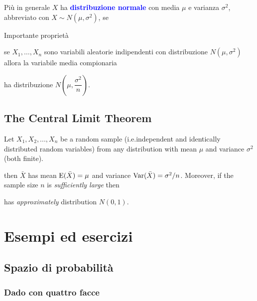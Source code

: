 \documentclass[12pt,openany]{book}
\def\E{{\rm E}}
\def\Var{{\rm Var}}
\def\emph#1{\textcolor{blue}{\textbf{\boldmath #1}}}
\theoremstyle{mio}
\theoremstyle{liscio}
\begin{document}
Più in generale $X$ ha \emph{distribuzione normale\/} con media $\mu$ e varianza $\sigma^2$, abbreviato con $X\sim N(\mu,\sigma^2)$, se

\medskip


\medskip

Importante proprietà




se $X_1,\dots,X_n$ sono variabili aleatorie indipendenti con distribuzione $N(\mu,\sigma^2)$ allora la variabile media compionaria

\ceq{\hfill \emph{$\bar X$}}{=}{\frac1n\sum_{i=1}^n X_i}

ha distribuzione $N(\mu,\dfrac{\sigma^2}{n})$.



\hfill{}\clearpage\section{The Central Limit Theorem}
\label{distribuzione normale}

Let $X_1, X_2, ... , X_n$ be a random sample (i.e.\@ independent and identically distributed random variables) from any distribution with mean $\mu$ and variance $\sigma^2$ (both finite).

then $\bar X$ has mean $\E(\bar X)=\mu$ and variance $\Var(\bar X)=\sigma^2/n$. Moreover, if the sample size $n$ is \textit{sufficiently large\/} then 

\ceq{\hfill \emph{$Z$}}{=}{\frac{\bar X - \mu}{\sigma/\sqrt{n}}}

has \textit{approximately\/} distribution $N(0,1)$.




\chapter{Esempi ed esercizi}
\label{ch2}


\hfill{}\clearpage\section{Spazio di probabilità}

\subsection{Dado con quattro facce}
\label{tetraedro}
\end{document}
